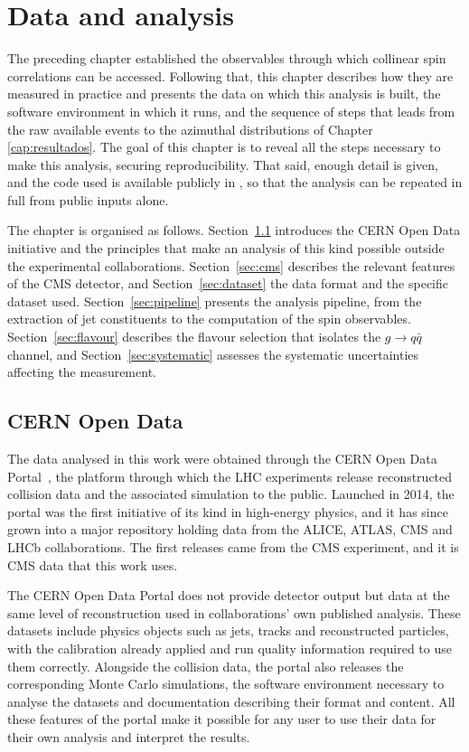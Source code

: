 \chapter{Data and analysis}
\label{cap:metodos}

The preceding chapter established the observables through which collinear spin
correlations can be accessed. Following that, this chapter describes how they are
measured in practice and presents the data on which this analysis is built, the
software environment in which it runs, and the sequence of steps that leads from the
raw available events to the azimuthal distributions of Chapter \ref{cap:resultados}.
The goal of this chapter is to reveal all the steps necessary to make this analysis,
securing reproducibility. That said, enough detail is given, and the code used is
available publicly in \cite{Mendonca:CMSJetSubstructure}, 
so that the analysis can be repeated in full from public inputs alone.

The chapter is organised as follows. Section~\ref{sec:opendata} introduces the
CERN Open Data initiative and the principles that make an analysis of this kind
possible outside the experimental collaborations. Section~\ref{sec:cms} describes
the relevant features of the CMS detector, and Section~\ref{sec:dataset} the data
format and the specific dataset used. Section~\ref{sec:pipeline} presents the
analysis pipeline, from the extraction of jet constituents to the computation of
the spin observables. Section~\ref{sec:flavour} describes the flavour selection
that isolates the $g \to q\bar{q}$ channel, and Section~\ref{sec:systematic}
assesses the systematic uncertainties affecting the measurement.

\section{CERN Open Data}
\label{sec:opendata}

The data analysed in this work were obtained through the CERN Open Data
Portal~\cite{CERNOpenData}, the platform through which the LHC experiments
release reconstructed collision data and the associated simulation to the public.
Launched in 2014, the portal was the first initiative of its kind in high-energy
physics, and it has since grown into a major repository holding data from
the ALICE, ATLAS, CMS and LHCb collaborations. The first releases came from the
CMS experiment, and it is CMS data that this work uses.

The CERN Open Data Portal does not provide detector output but data at the same level
of reconstruction used in collaborations' own published analysis. These datasets
include physics objects such as jets, tracks and reconstructed particles, with the
calibration already applied and run quality information required to use them correctly.
Alongside the collision data, the portal also releases the corresponding Monte Carlo simulations,
the software environment necessary to analyse the datasets and documentation describing their
format and content. All these features of the portal make it possible for any user to
use their data for their own analysis and interpret the results.

